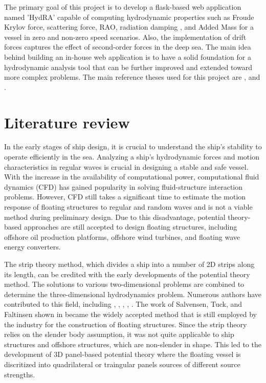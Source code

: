 The primary goal of this project is to develop a flask-based web application named 'HydRA' capable of computing hydrodynamic properties such as Froude Krylov force, scattering force, RAO, radiation damping 
 , and Added Mass for a vessel in zero and non-zero speed scenarios. Also, the implementation of drift forces captures the effect of second-order forces in the deep sea. The main idea behind building an in-house web application is to have a solid foundation for a hydrodynamic analysis tool that can be further improved and extended toward more complex problems. The main reference theses used for this project are \citet{guha2015estimation}, and \cite{guha2012development}.

\section{Literature review}

In the early stages of ship design, it is crucial to understand the ship's stability to operate efficiently in the sea. Analyzing a ship's hydrodynamic forces and motion characteristics in regular waves is crucial in  designing a stable and safe vessel. With the increase in the availability of computational power, computational fluid dynamics (CFD) has gained popularity in solving fluid-structure interaction problems. However, CFD still takes a significant time to estimate the motion response of floating structures to regular and random waves and is not a viable method during preliminary design. Due to this disadvantage, potential theory-based approaches are still accepted to design floating structures, including offshore oil production platforms, offshore wind turbines, and floating wave energy converters.

The strip theory method, which divides a ship into a number of 2D strips along its length, can be credited with the early developments of the potential theory method. The solutions to various two-dimensional problems are combined to determine the three-dimensional hydrodynamics problem. Numerous authors have contributed to this field, including \cite{newman1979theory}, \cite{ogilvie1969rational}, \cite{beck1990documentation}, \cite{journee2001theoretical}, \cite{salvesen1970ship}. The work of Salvensen, Tuck, and Faltinsen shown in \cite{salvesen1970ship} became the widely accepted method that is still employed by the industry for the construction of floating structures. Since the strip theory relies on the slender body assumption, it was not quite applicable to ship structures and offshore structures, which are non-slender in shape. This led to the development of 3D panel-based potential theory where the floating vessel is discritized into quadrilateral or traingular panels sources of different source strengths.

